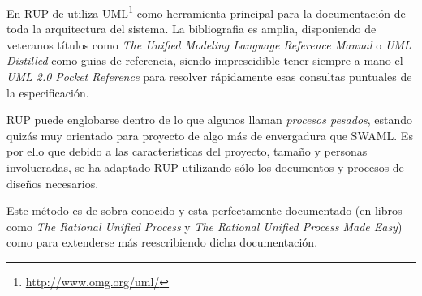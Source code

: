 En RUP de utiliza UML\footnote{\url{http://www.omg.org/uml/}} como herramienta principal
para la documentación de toda la arquitectura del sistema. La bibliografia es amplia,
disponiendo de veteranos títulos como 
\emph{The Unified Modeling Language Reference Manual}\cite{UMLReference} o 
\emph{UML Distilled}\cite{UMLDistilled} como guias de referencia, siendo imprescidible
tener siempre a mano el \emph{UML 2.0 Pocket Reference}\cite{UMLPocket} para resolver
rápidamente esas consultas puntuales de la especificación.

RUP puede englobarse dentro de lo que algunos llaman \emph{procesos pesados},
estando quizás muy orientado para proyecto de algo más de envergadura que SWAML.
Es por ello que debido a las caracteristicas del proyecto, tamaño y personas 
involucradas, se ha adaptado RUP utilizando sólo los documentos y procesos de 
diseños necesarios.

Este método es de sobra conocido y esta perfectamente documentado (en libros como
\emph{The Rational Unified Process}\cite{RUPIntro} y
\emph{The Rational Unified Process Made Easy}\cite{RUPEasy}) como para
extenderse más reescribiendo dicha documentación.
